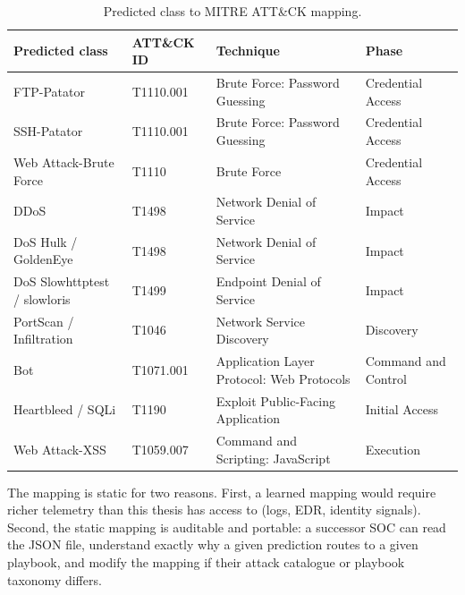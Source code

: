\begin{table}[H]
    \centering
    \caption{Predicted class to MITRE ATT\&CK mapping.}
    \label{tab:mitre-mapping}
    \footnotesize
    \begin{tabular}{p{4.0cm}p{1.8cm}p{5.0cm}p{3.5cm}}
        \toprule
        \textbf{Predicted class} & \textbf{ATT\&CK ID} & \textbf{Technique} & \textbf{Phase} \\
        \midrule
        FTP-Patator & T1110.001 & Brute Force: Password Guessing & Credential Access \\
        SSH-Patator & T1110.001 & Brute Force: Password Guessing & Credential Access \\
        Web Attack-Brute Force & T1110 & Brute Force & Credential Access \\
        DDoS & T1498 & Network Denial of Service & Impact \\
        DoS Hulk / GoldenEye & T1498 & Network Denial of Service & Impact \\
        DoS Slowhttptest / slowloris & T1499 & Endpoint Denial of Service & Impact \\
        PortScan / Infiltration & T1046 & Network Service Discovery & Discovery \\
        Bot & T1071.001 & Application Layer Protocol: Web Protocols & Command and Control \\
        Heartbleed / SQLi & T1190 & Exploit Public-Facing Application & Initial Access \\
        Web Attack-XSS & T1059.007 & Command and Scripting: JavaScript & Execution \\
        \bottomrule
    \end{tabular}
\end{table}

The mapping is static for two reasons. First, a learned mapping would
require richer telemetry than this thesis has access to (logs, EDR,
identity signals). Second, the static mapping is auditable and portable:
a successor SOC can read the JSON file, understand exactly why a given
prediction routes to a given playbook, and modify the mapping if their
attack catalogue or playbook taxonomy differs.
